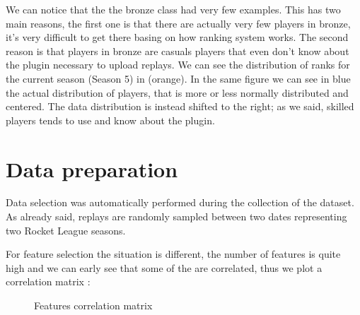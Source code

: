 We can notice that the the bronze class had very few examples. This has two main reasons, the first one is that there are actually very few players in bronze, it's very difficult to get there basing on how ranking system works. The second reason is that players in bronze are casuals players that even don't know about the plugin necessary to upload replays. We can see the distribution of ranks for the current season (Season 5) in  (orange). In the same figure we can see in blue the actual distribution of players, that is more or less normally distributed and centered. The data distribution is instead shifted to the right; as we said, skilled players tends to use and know about the plugin.

\section{Data preparation}

Data selection was automatically performed during the collection of the dataset. As already said, replays are randomly sampled between two dates representing two Rocket League seasons.

For feature selection the situation is different, the number of features is quite high and we can early see that some of the are correlated, thus we plot a correlation matrix :

\begin{figure}[H]
    \label{fig:corr_matrix}
    \caption{Features correlation matrix}
\end{figure}

